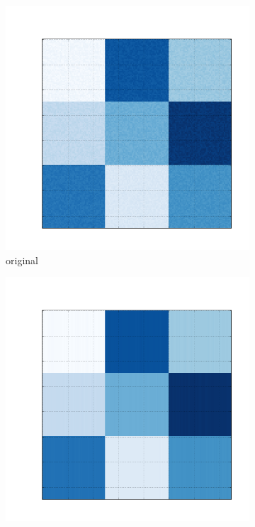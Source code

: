 \documentclass[10pt]{beamer}
\begin{document}
\begin{frame}
\begin{figure}[H]
      \begin{subfigure}[b]{0.13\textwidth}
          \includegraphics[width=\textwidth]{img/c-bic-structure.png}
          \caption*{original}
      \end{subfigure}
      \begin{subfigure}[b]{0.13\textwidth}
          \includegraphics[width=\textwidth]{img/c-reconstruction-kmeans.png}

\end{subfigure}
\end{figure}
\end{frame}
\end{document}
